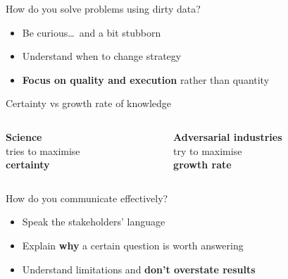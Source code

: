 \begin{frame}{How do you solve problems using dirty data?}
    \large%
    \begin{itemize}
        \setlength{\itemsep}{\medskipamount}
        \item Be curious\ldots~and a bit stubborn
        \item Understand when to change strategy
        \item \textbf{Focus on quality and execution} rather than quantity
    \end{itemize}
\end{frame}

\begin{frame}{Certainty vs growth rate of knowledge}
    \begin{columns}
        \begin{column}{0.5\textwidth}
            \begin{center}
                {\large\bf%
                 Science} \\[\medskipamount]
                tries to maximise \\[\medskipamount]
                {\large\bf%
                 certainty}
            \end{center}
        \end{column}
        \begin{column}{0.5\textwidth}
            \begin{center}
                {\large\bf%
                 Adversarial industries} \\[\medskipamount]
                try to maximise \\[\medskipamount]
                {\large\bf%
                 growth rate}
            \end{center}
        \end{column}
    \end{columns}
\end{frame}

\begin{frame}{How do you communicate effectively?}
    \large%
    \begin{itemize}
        \setlength{\itemsep}{\medskipamount}
        \item Speak the stakeholders' language
        \item Explain \textbf{why} a certain question is worth answering
        \item Understand limitations and \textbf{don't overstate results}
    \end{itemize}
\end{frame}



